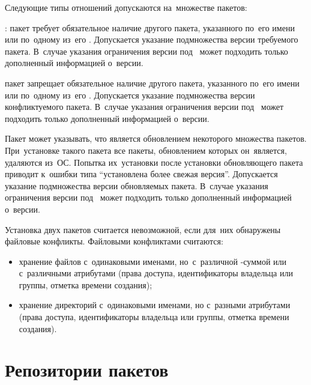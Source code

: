 Следующие типы отношений допускаются на~множестве пакетов:

\begin{description}

\item{:}
пакет требует обязательное наличие другого пакета, указанного по~его имени или по~одному из~его .
Допускается указание подмножества версии требуемого пакета.
В~случае указания ограничения версии под~ может подходить  только дополненный информацией о~версии.

\item[\EN{Conflicts}:]
пакет запрещает обязательное наличие другого пакета, указанного по~его имени или по~одному из~его .
Допускается указание подмножества версии конфликтуемого пакета.
В~случае указания ограничения версии под~ может подходить  только дополненный информацией о~версии.

\item[\EN{Obsoletes}:]
Пакет может указывать, что является обновлением некоторого множества пакетов.
При~установке такого пакета все пакеты, обновлением которых он~является, удаляются из~ОС.
Попытка их~установки после установки обновляющего пакета приводит к~ошибки типа ``установлена более свежая версия''.
Допускается указание подмножества версии обновляемых пакета.
В~случае указания ограничения версии под~ может подходить  только дополненный информацией о~версии.

\end{description}

Установка двух пакетов считается невозможной, если для~них обнаружены файловые конфликты.
Файловыми конфликтами считаются:


\begin{itemize}

\item {
хранение файлов с~одинаковыми именами, но~с~различной -суммой или с~различными атрибутами 
(права доступа, идентификаторы владельца или группы, отметка времени создания);
}

\item {
хранение директорий с~одинаковыми именами, но с~разными атрибутами 
(права доступа, идентификаторы владельца или группы, отметка времени создания).
}

\end{itemize}

\section{Репозитории пакетов}

